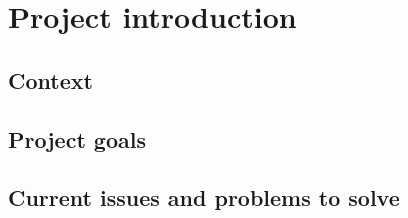 \documentclass[report.tex]{subfiles}
\begin{document}
\section{Project introduction}


\subsection{Context}


\subsection{Project goals}

\subsection{Current issues and problems to solve}
\end{document}
